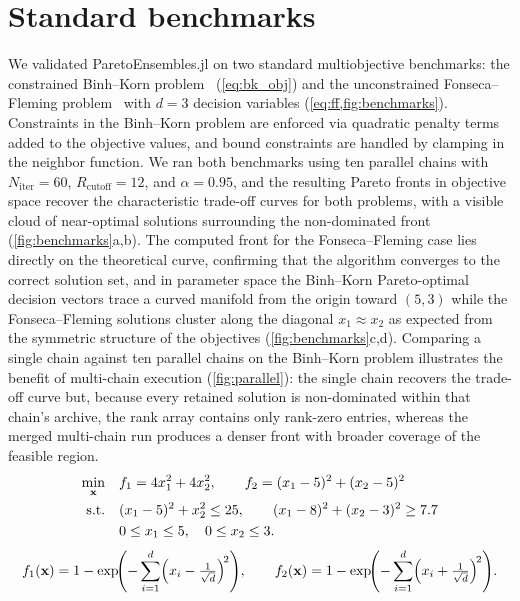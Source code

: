 \documentclass[preprint,review,12pt]{elsarticle}
\begin{document}
\clearpage
\section{Standard benchmarks}\label{sec:si_benchmarks}
We validated ParetoEnsembles.jl on two standard multiobjective benchmarks: the constrained Binh--Korn problem~\cite{Binh1997} (\cref{eq:bk_obj}) and the unconstrained Fonseca--Fleming problem~\cite{Fonseca1995} with $d = 3$ decision variables (\cref{eq:ff,fig:benchmarks}).
Constraints in the Binh--Korn problem are enforced via quadratic penalty terms added to the objective values, and bound constraints are handled by clamping in the neighbor function.
We ran both benchmarks using ten parallel chains with $N_{\text{iter}} = 60$, $R_{\text{cutoff}} = 12$, and $\alpha = 0.95$, and the resulting Pareto fronts in objective space recover the characteristic trade-off curves for both problems, with a visible cloud of near-optimal solutions surrounding the non-dominated front (\cref{fig:benchmarks}a,b).
The computed front for the Fonseca--Fleming case lies directly on the theoretical curve, confirming that the algorithm converges to the correct solution set, and in parameter space the Binh--Korn Pareto-optimal decision vectors trace a curved manifold from the origin toward $(5, 3)$ while the Fonseca--Fleming solutions cluster along the diagonal $x_1 \approx x_2$ as expected from the symmetric structure of the objectives (\cref{fig:benchmarks}c,d).
Comparing a single chain against ten parallel chains on the Binh--Korn problem illustrates the benefit of multi-chain execution (\cref{fig:parallel}): the single chain recovers the trade-off curve but, because every retained solution is non-dominated within that chain's archive, the rank array contains only rank-zero entries, whereas the merged multi-chain run produces a denser front with broader coverage of the feasible region.
\begin{align}
  \min_{\mathbf{x}} \quad & f_1 = 4x_1^2 + 4x_2^2, \qquad f_2 = (x_1 - 5)^2 + (x_2 - 5)^2 \label{eq:bk_obj} \\
  \text{s.t.} \quad & (x_1 - 5)^2 + x_2^2 \leq 25, \qquad (x_1 - 8)^2 + (x_2 - 3)^2 \geq 7.7 \notag \\
  & 0 \leq x_1 \leq 5, \quad 0 \leq x_2 \leq 3. \notag
\end{align}
\begin{equation}\label{eq:ff}
  f_1(\mathbf{x}) = 1 - \exp\!\Biggl(-\sum_{i=1}^{d}\Bigl(x_i - \tfrac{1}{\sqrt{d}}\Bigr)^{\!2}\Biggr), \qquad
  f_2(\mathbf{x}) = 1 - \exp\!\Biggl(-\sum_{i=1}^{d}\Bigl(x_i + \tfrac{1}{\sqrt{d}}\Bigr)^{\!2}\Biggr).
\end{equation}
\end{document}

